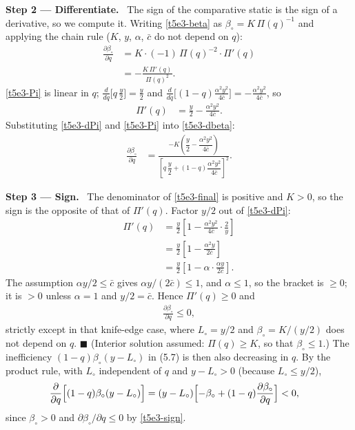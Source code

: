 \documentclass[11pt,a4paper]{article}
\newcommand{\step}[2]{\par\medskip\noindent\textbf{Step #1 --- #2.}~}
\begin{document}
\step{2}{Differentiate} The sign of the comparative static is the sign of a derivative, so we compute
it. Writing \eqref{t5e3-beta} as $\beta_\circ=K\,\Pi(q)^{-1}$ and applying the chain rule ($K$, $y$,
$\alpha$, $\bar c$ do not depend on $q$):
\begin{align}
  \frac{\partial\beta_\circ}{\partial q} &= K\cdot(-1)\,\Pi(q)^{-2}\cdot\Pi'(q) \nonumber\\
  &= -\frac{K\,\Pi'(q)}{\Pi(q)^2}. \label{t5e3-dbeta}
\end{align}
\eqref{t5e3-Pi} is linear in $q$; $\frac{d}{dq}\bigl[q\,\tfrac y2\bigr]=\tfrac y2$ and
$\frac{d}{dq}\bigl[(1-q)\tfrac{\alpha^2y^2}{4\bar c}\bigr]=-\tfrac{\alpha^2y^2}{4\bar c}$, so
\begin{align}
  \Pi'(q) &= \frac{y}{2}-\frac{\alpha^2y^2}{4\bar c}. \label{t5e3-dPi}
\end{align}
Substituting \eqref{t5e3-dPi} and \eqref{t5e3-Pi} into \eqref{t5e3-dbeta}:
\begin{align}
  \frac{\partial\beta_\circ}{\partial q} &= \frac{-K\left(\dfrac{y}{2}-\dfrac{\alpha^2y^2}{4\bar c}\right)}{\left[q\,\dfrac{y}{2}+(1-q)\dfrac{\alpha^2y^2}{4\bar c}\right]^2}. \label{t5e3-final}
\end{align}

\step{3}{Sign} The denominator of \eqref{t5e3-final} is positive and $K>0$, so the sign is the
opposite of that of $\Pi'(q)$. Factor $y/2$ out of \eqref{t5e3-dPi}:
\begin{align}
  \Pi'(q) &= \frac{y}{2}\left[1-\frac{\alpha^2y^2}{4\bar c}\cdot\frac{2}{y}\right] \nonumber\\
          &= \frac{y}{2}\left[1-\frac{\alpha^2y}{2\bar c}\right] \nonumber\\
          &= \frac{y}{2}\left[1-\alpha\cdot\frac{\alpha y}{2\bar c}\right]. \label{t5e3-factor}
\end{align}
The assumption $\alpha y/2\leq\bar c$ gives $\alpha y/(2\bar c)\leq 1$, and $\alpha\leq1$, so the
bracket is $\geq0$; it is $>0$ unless $\alpha=1$ and $y/2=\bar c$. Hence $\Pi'(q)\geq0$ and
\begin{align}
  \frac{\partial\beta_\circ}{\partial q}\leq 0, \label{t5e3-sign}
\end{align}
strictly except in that knife-edge case, where $L_\circ=y/2$ and $\beta_\circ=K/(y/2)$ does not
depend on $q$. $\blacksquare$ (Interior solution assumed: $\Pi(q)\geq K$, so that $\beta_\circ\leq1$.)
The inefficiency $(1-q)\beta_\circ(y-L_\circ)$ in (5.7) is then also decreasing in $q$. By the
product rule, with $L_\circ$ independent of $q$ and $y-L_\circ>0$ (because $L_\circ\le y/2$),
\begin{align}
  \frac{\partial}{\partial q}\Bigl[(1-q)\beta_\circ(y-L_\circ)\Bigr]
  &= (y-L_\circ)\Bigl[-\beta_\circ+(1-q)\frac{\partial\beta_\circ}{\partial q}\Bigr]<0, \label{t5e3-ineff}
\end{align}
since $\beta_\circ>0$ and $\partial\beta_\circ/\partial q\le0$ by \eqref{t5e3-sign}.
\end{document}
